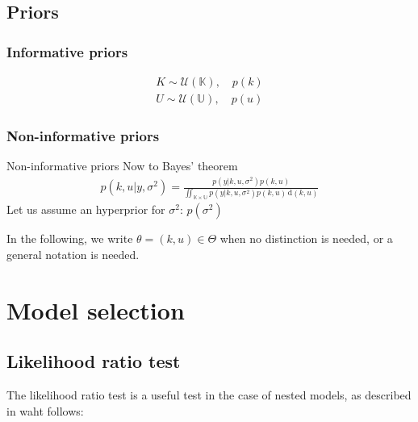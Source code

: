 \documentclass[a4paper,11pt]{article}
\theoremstyle{defi}
\numberwithin{thmCounter}{section}
\begin{document}
\subsection{Priors}
\subsubsection{Informative priors}
\label{sec:informative_priors}

\begin{align*}
  K \sim \mathcal{U}(\mathbb{K}), \quad p(k) \\
  U \sim \mathcal{U}(\mathbb{U}), \quad p(u)
\end{align*}

\subsubsection{Non-informative priors}
\label{sec:non-info_priors}
Non-informative priors 
Now to Bayes' theorem
\begin{align*}
  p(k,u | y,\sigma^2) = \frac{p(y | k, u, \sigma^2) p(k,u)}{\iint_{\mathbb{K}\times\mathbb{U}} p(y | k, u, \sigma^2) p(k,u) \, \mathrm{d}(k,u)}
\end{align*}
  Let us assume an hyperprior for $\sigma^2$: $p(\sigma^2)$

In the following, we write $\theta = (k, u)\in \Theta$ when no distinction is needed, or a general notation is needed.

\section{Model selection}
\label{sec:model_selection}

\subsection{Likelihood ratio test}
The likelihood ratio test is a useful test in the case of nested models, as described in waht follows:
\end{document}
